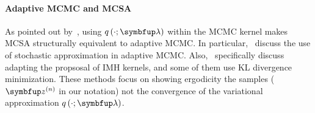 \vspace{-0.12in}
\paragraph{Adaptive MCMC and MCSA}
As pointed out by~\citet{pmlr-v124-ou20a}, using \(q\left(\cdot; \vlambda\right)\) within the MCMC kernel makes MCSA structurally equivalent to adaptive MCMC.
In particular,~\citet{10.1007/s11222-008-9110-y, garthwaite_adaptive_2016, pmlr-v151-brofos22a, gabrie_adaptive_2022} discuss the use of stochastic approximation in adaptive MCMC.
Also,~\citet{andrieu_ergodicity_2006, keith_adaptive_2008, holden_adaptive_2009, giordani_adaptive_2010, pmlr-v151-brofos22a, habib2018auxiliary, neklyudov_metropolishastings_2019} specifically discuss adapting the propsosal of IMH kernels, and some of them use KL divergence minimization.
These methods focus on showing ergodicity the samples (\(\vz^{(n)}\) in our notation) not the convergence of the variational approximation \(q\left(\cdot; \vlambda\right)\).



